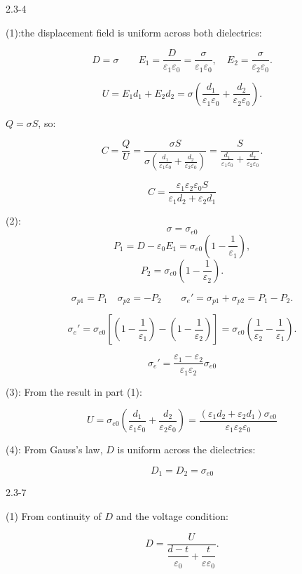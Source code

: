 \documentclass{article}
\begin{document}
2.3-4

(1):the displacement field is uniform across both dielectrics:  

$$D = \sigma\qquad E_1 = \frac{D}{\varepsilon_1\varepsilon_0} = \frac{\sigma}{\varepsilon_1\varepsilon_0}, \quad E_2 = \frac{\sigma}{\varepsilon_2\varepsilon_0}.$$


$$U = E_1 d_1 + E_2 d_2 = \sigma \left( \frac{d_1}{\varepsilon_1\varepsilon_0} + \frac{d_2}{\varepsilon_2\varepsilon_0} \right).$$

 $Q = \sigma S$, so:  

$$C = \frac{Q}{U} = \frac{\sigma S}{\sigma\left( \frac{d_1}{\varepsilon_1\varepsilon_0} + \frac{d_2}{\varepsilon_2\varepsilon_0} \right)}= \frac{S}{\frac{d_1}{\varepsilon_1\varepsilon_0} + \frac{d_2}{\varepsilon_2\varepsilon_0}}.$$

$$C=\frac{\varepsilon_1\varepsilon_2\varepsilon_0S}{\varepsilon_1d_2+\varepsilon_2d_1}$$

(2): 
$$\sigma=\sigma_{e0}$$
$$
P_1 = D - \varepsilon_0 E_1 = \sigma_{e0} \left( 1 - \frac{1}{\varepsilon_1} \right),
$$
$$
P_2 = \sigma_{e0} \left( 1 - \frac{1}{\varepsilon_2} \right).
$$

$$\sigma_{p1} = P_1\quad  \sigma_{p2} = -P_2\qquad \sigma_e' = \sigma_{p1} + \sigma_{p2} = P_1 - P_2.$$



$$\sigma_e' = \sigma_{e0} \left[ \left(1 - \frac{1}{\varepsilon_1}\right) - \left(1 - \frac{1}{\varepsilon_2}\right) \right]= \sigma_{e0}  \left( \frac{1}{\varepsilon_2} - \frac{1}{\varepsilon_1} \right).$$

$$\sigma_e' = \frac{\varepsilon_1-\varepsilon_2}{\varepsilon_1\varepsilon_2}\sigma_{e0}$$



(3): From the result in part (1):  

$$U = \sigma_{e0} \left( \frac{d_1}{\varepsilon_1\varepsilon_0} + \frac{d_2}{\varepsilon_2\varepsilon_0} \right)=\frac{\left(\varepsilon_1d_2+\varepsilon_2d_1\right)\sigma_{e0}}{\varepsilon_1\varepsilon_2\varepsilon_0}$$

 (4): From Gauss’s law, $D$ is uniform across the dielectrics:  

$$D_1 = D_2 = \sigma_{e0}$$




\newpage


2.3-7

(1) From continuity of $ D $ and the voltage condition:

$$D = \frac{U}{\dfrac{d-t}{\varepsilon_0} + \dfrac{t}{\varepsilon\varepsilon_0}}.$$
\end{document}
